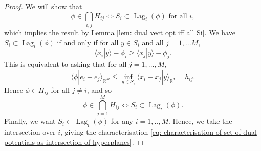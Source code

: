 \documentclass[11pt, oneside, titlepage]{book}
\theoremstyle{plain}
\theoremstyle{definition}
\newcommand{\R}{\mathbb{R}}
\DeclareMathOperator{\lag}{Lag}
\begin{document}
\begin{proof}
We will show that
\begin{equation*}
    \phi \in \bigcap_{i, j} H_{ij} \iff S_i \subset \lag_i(\phi) \text{ for all } i,
\end{equation*}
which implies the result by Lemma \ref{lem: dual vect opt iff all Si}. We have $S_i \subset \lag_i(\phi)$ if and only if for all $y \in S_i$ and all $j=1,...M$,
\begin{equation}
\label{eq: point in cell iff psi hyperplane}
    \langle x_i | y \rangle - \phi_i \geq \langle x_j | y \rangle - \phi_j.
\end{equation}
This is equivalent to asking that for all $j =1,...,M$,
\begin{equation*}
    \langle \phi | e_i - e_j \rangle_{\R^M} \leq \inf_{y \in S_i}\langle x_i - x_j | y \rangle_{\R^d} = h_{ij}.
\end{equation*}
Hence $\phi \in H_{ij}$ for all $j \neq i$, and so
\begin{equation*}
    \phi \in \bigcap_{j=1}^M H_{ij} \iff S_i \subset \lag_i(\phi).
\end{equation*}
Finally, we want $S_i \subset \lag_i(\phi)$ for any $i=1,..,M$. Hence, we take the intersection over $i$, giving the characterisation \eqref{eq: characterisation of set of dual potentials as intersection of hyperplanes}.
\end{proof}
\end{document}
